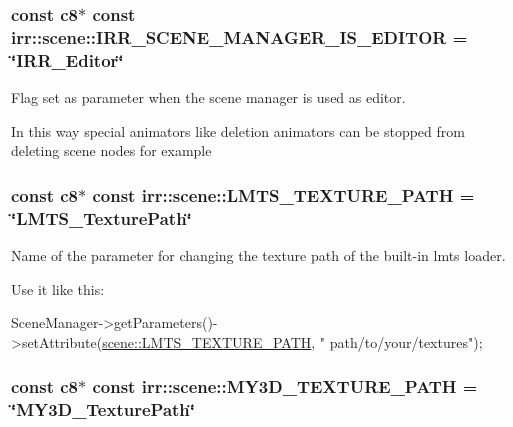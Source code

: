 \subsubsection[{\texorpdfstring{I\+R\+R\+\_\+\+S\+C\+E\+N\+E\+\_\+\+M\+A\+N\+A\+G\+E\+R\+\_\+\+I\+S\+\_\+\+E\+D\+I\+T\+OR}{IRR\_SCENE\_MANAGER\_IS\_EDITOR}}]{\setlength{\rightskip}{0pt plus 5cm}const {\bf c8}$\ast$ const irr\+::scene\+::\+I\+R\+R\+\_\+\+S\+C\+E\+N\+E\+\_\+\+M\+A\+N\+A\+G\+E\+R\+\_\+\+I\+S\+\_\+\+E\+D\+I\+T\+OR = \char`\"{}I\+R\+R\+\_\+\+Editor\char`\"{}}\hypertarget{namespaceirr_1_1scene_a7a3f4a75d85bd2b3f6bc4dd58f3ce585}{}\label{namespaceirr_1_1scene_a7a3f4a75d85bd2b3f6bc4dd58f3ce585}


Flag set as parameter when the scene manager is used as editor. 

In this way special animators like deletion animators can be stopped from deleting scene nodes for example 
\subsubsection[{\texorpdfstring{L\+M\+T\+S\+\_\+\+T\+E\+X\+T\+U\+R\+E\+\_\+\+P\+A\+TH}{LMTS\_TEXTURE\_PATH}}]{\setlength{\rightskip}{0pt plus 5cm}const {\bf c8}$\ast$ const irr\+::scene\+::\+L\+M\+T\+S\+\_\+\+T\+E\+X\+T\+U\+R\+E\+\_\+\+P\+A\+TH = \char`\"{}L\+M\+T\+S\+\_\+\+Texture\+Path\char`\"{}}\hypertarget{namespaceirr_1_1scene_a1d81a2ac8866dfa4a0ff3bdece327f75}{}\label{namespaceirr_1_1scene_a1d81a2ac8866dfa4a0ff3bdece327f75}


Name of the parameter for changing the texture path of the built-\/in lmts loader. 

Use it like this\+: 
\begin{DoxyCode}
SceneManager->getParameters()->setAttribute(\hyperlink{namespaceirr_1_1scene_a1d81a2ac8866dfa4a0ff3bdece327f75}{scene::LMTS\_TEXTURE\_PATH}, \textcolor{stringliteral}{"
      path/to/your/textures"});
\end{DoxyCode}
\subsubsection[{\texorpdfstring{M\+Y3\+D\+\_\+\+T\+E\+X\+T\+U\+R\+E\+\_\+\+P\+A\+TH}{MY3D\_TEXTURE\_PATH}}]{\setlength{\rightskip}{0pt plus 5cm}const {\bf c8}$\ast$ const irr\+::scene\+::\+M\+Y3\+D\+\_\+\+T\+E\+X\+T\+U\+R\+E\+\_\+\+P\+A\+TH = \char`\"{}M\+Y3\+D\+\_\+\+Texture\+Path\char`\"{}}\hypertarget{namespaceirr_1_1scene_a54eb9ea68ba13b4689444f8d34e338b9}{}\label{namespaceirr_1_1scene_a54eb9ea68ba13b4689444f8d34e338b9}


